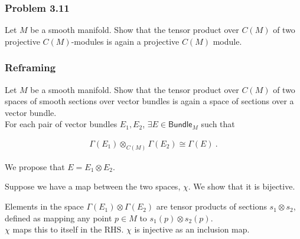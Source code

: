 \begin{frame}
    \frametitle{Problem 3.11}

    Let \(M\) be a smooth manifold. Show that the tensor product over \(C(M)\)
    of two projective \(C(M)\)-modules is again a projective \(C(M)\) module.


\end{frame}

\begin{frame}
    \frametitle{Reframing}

    Let \(M\) be a smooth manifold. Show that the tensor product over \(C(M)\)
    of two spaces of smooth sections over vector bundles is again a space of
    sections over a vector bundle. \\

    For each pair of vector bundles \(E_1, E_2\), \(\exists E \in
    \textsf{Bundle}_M\) such that 
    
    \begin{gather*}        
        \Gamma(E_1) \otimes_{C(M)} \Gamma(E_2) \cong \Gamma(E)~.
    \end{gather*}

\end{frame}

\begin{frame}

    We propose that \(E = E_1\otimes E_2\).

    Suppose we have a map between the two spaces, \(\chi\). We show that it is
    bijective.

    Elements in the space \(\Gamma(E_1) \otimes \Gamma(E_2)\) are tensor
    products of sections \(s_1 \otimes s_2\), defined as mapping any point \(p
    \in M\) to \(s_1(p)\otimes s_2(p)\). \\

    \(\chi\) maps this to itself in the RHS. \(\chi\) is injective as an
    inclusion map.

\end{frame}

